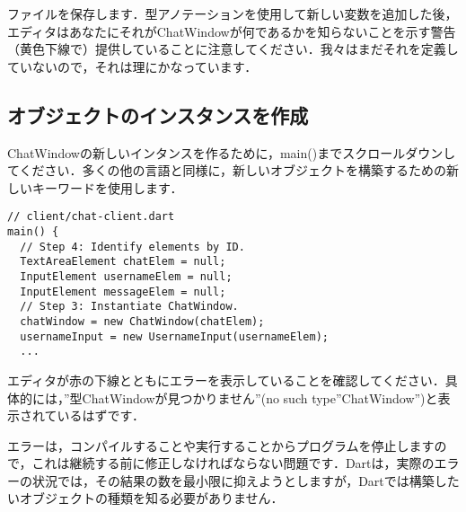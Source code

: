 
ファイルを保存します．型アノテーションを使用して新しい変数を追加した後，エディタはあなたにそれがChatWindowが何であるかを知らないことを示す警告（黄色下線で）提供していることに注意してください．我々はまだそれを定義していないので，それは理にかなっています．



\subsection{オブジェクトのインスタンスを作成}

ChatWindowの新しいインタンスを作るために，main()までスクロールダウンしてください．多くの他の言語と同様に，新しいオブジェクトを構築するための新しいキーワードを使用します．

\begin{verbatim}
// client/chat-client.dart
main() {
  // Step 4: Identify elements by ID.
  TextAreaElement chatElem = null;
  InputElement usernameElem = null;
  InputElement messageElem = null;
  // Step 3: Instantiate ChatWindow.
  chatWindow = new ChatWindow(chatElem);
  usernameInput = new UsernameInput(usernameElem);
  ...
\end{verbatim}

エディタが赤の下線とともにエラーを表示していることを確認してください．具体的には，''型ChatWindowが見つかりません''(no such type''ChatWindow'')と表示されているはずです．


エラーは，コンパイルすることや実行することからプログラムを停止しますので，これは継続する前に修正しなければならない問題です．Dartは，実際のエラーの状況では，その結果の数を最小限に抑えようとしますが，Dartでは構築したいオブジェクトの種類を知る必要がありません．

